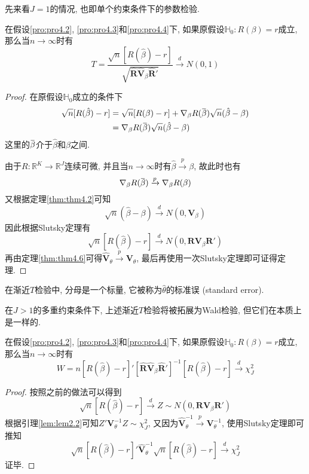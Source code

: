 \documentclass[cn, 12pt, math=mtpro2, bibstyle=apa, blue, twocol]{elegantbook}
\newcommand{\R}{\mathbb{R}}
\newcommand{\RH}{\mathbold{R}}
\newcommand{\hb}{\hat{\beta}}
\newcommand{\HH}{\mathbb{H}}
\newcommand{\V}{\mathbold{V}}
\newcommand{\overbar}[1]{\mkern 1.5mu\overline{\mkern-1.5mu#1\mkern-1.5mu}\mkern 1.5mu}
\begin{document}
先来看$J=1$的情况, 也即单个约束条件下的参数检验.
\begin{theorem}[渐近$T$统计量]
  在假设\ref{pro:pro4.2}, \ref{pro:pro4.3}和\ref{pro:pro4.4}下, 如果原假设$\HH_0:R(\beta)=r$成立, 那么当$n\to\infty$时有
  $$T=\frac{\sqrt{n}[R(\hb)-r]}{\sqrt{\hat{\RH}\hat{\V}_\beta\hat{\RH}'}}\xrightarrow{d}N(0,1)$$
\end{theorem}
\begin{proof}
  在原假设$\HH_0$成立的条件下
  \begin{align*}
  \sqrt{n}[R(\hb)-r]&=\sqrt{n}[R(\beta)-r]+\nabla_\beta R(\overbar{\beta})\sqrt{n}(\hb-\beta) \\
  &=\nabla_\beta R(\overbar{\beta})\sqrt{n}(\hb-\beta)
  \end{align*}
  这里的$\overbar{\beta}$介于$\hb$和$\beta$之间.

  由于$R:\R^K\to\R^J$连续可微, 并且当$n\to\infty$时有$\hb\xrightarrow{p}\beta$, 故此时也有
  $$\nabla_\beta R(\overbar{\beta})\xrightarrow{p}\nabla_\beta R(\beta)$$
  又根据定理\ref{thm:thm4.2}可知
  $$\sqrt{n}(\hb-\beta)\xrightarrow{d}N(0,\V_\beta)$$
  因此根据Slutsky定理有
  $$\sqrt{n}[R(\hb)-r]\xrightarrow{d}N(0,\RH\V_\beta\RH')$$
  再由定理\ref{thm:thm4.6}可得$\hat{\V}_\theta\xrightarrow{p}\V_\theta$, 最后再使用一次Slutsky定理即可证得定理.
\end{proof}
\begin{remark}
在渐近$T$检验中, 分母是一个标量, 它被称为$\hat{\theta}$的标准误 (standard error).
\end{remark}

在$J>1$的多重约束条件下, 上述渐近$T$检验将被拓展为Wald检验, 但它们在本质上是一样的.
\begin{theorem}[Wald检验统计量]
  在假设\ref{pro:pro4.2}, \ref{pro:pro4.3}和\ref{pro:pro4.4}下, 如果原假设$\HH_0:R(\beta)=r$成立, 那么当$n\to\infty$时有
  $$W=n[R(\hb)-r]'[\hat{\RH}\hat{\V}_\beta\hat{\RH}']^{-1}[R(\hb)-r]\xrightarrow{d}\chi^2_J$$
\end{theorem}
\begin{proof}
  按照之前的做法可以得到
  $$\sqrt{n}[R(\hb)-r]\xrightarrow{d}Z\sim N(0,\RH\V_\beta\RH')$$
  根据引理\ref{lem:lem2.2}可知$Z'\V_\theta^{-1}Z\sim\chi^2_J$, 又因为$\hat{\V}_\theta^{-1}\xrightarrow{p}\V_\theta^{-1}$, 使用Slutsky定理即可推知
  $$\sqrt{n}[R(\hb)-r]'\hat{\V}_\theta^{-1}\sqrt{n}[R(\hb)-r]\xrightarrow{d}\chi^2_J$$
  证毕.
\end{proof}
\end{document}
